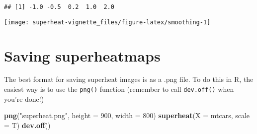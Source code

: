 \documentclass[]{book}
\newenvironment{Shaded}{\begin{snugshade}}{\end{snugshade}}
\newcommand{\KeywordTok}[1]{\textcolor[rgb]{0.13,0.29,0.53}{\textbf{{#1}}}}
\newcommand{\DataTypeTok}[1]{\textcolor[rgb]{0.13,0.29,0.53}{{#1}}}
\newcommand{\DecValTok}[1]{\textcolor[rgb]{0.00,0.00,0.81}{{#1}}}
\newcommand{\FloatTok}[1]{\textcolor[rgb]{0.00,0.00,0.81}{{#1}}}
\newcommand{\StringTok}[1]{\textcolor[rgb]{0.31,0.60,0.02}{{#1}}}
\newcommand{\CommentTok}[1]{\textcolor[rgb]{0.56,0.35,0.01}{\textit{{#1}}}}
\newcommand{\OtherTok}[1]{\textcolor[rgb]{0.56,0.35,0.01}{{#1}}}
\newcommand{\NormalTok}[1]{{#1}}
\theoremstyle{definition}
\theoremstyle{definition}
\theoremstyle{remark}
\begin{document}
\begin{Shaded}
\end{Shaded}

\begin{verbatim}
## [1] -1.0 -0.5  0.2  1.0  2.0
\end{verbatim}

\begin{center}\texttt{[image: superheat-vignette\_files/figure-latex/smoothing-1]} \end{center}

\chapter{Saving superheatmaps}\label{saving-superheatmaps}

The best format for saving superheat images is as a .png file. To do
this in R, the easiest way is to use the \texttt{png()} function
(remember to call \texttt{dev.off()} when you're done!)

\begin{Shaded}
\begin{Highlighting}[]
\KeywordTok{png}\NormalTok{(}\StringTok{"superheat.png"}\NormalTok{, }\DataTypeTok{height =} \DecValTok{900}\NormalTok{, }\DataTypeTok{width =} \DecValTok{800}\NormalTok{)}
\KeywordTok{superheat}\NormalTok{(}\DataTypeTok{X =} \NormalTok{mtcars, }\DataTypeTok{scale =} \NormalTok{T)}
\KeywordTok{dev.off}\NormalTok{()}
\end{Highlighting}
\end{Shaded}
\end{document}

